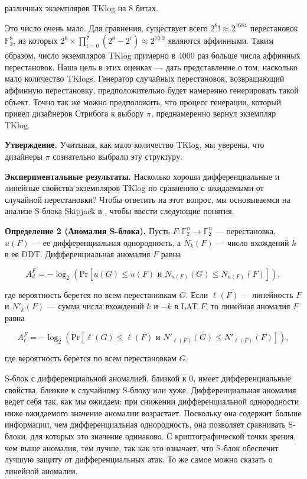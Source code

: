 различных экземпляров TKlog на 8 битах.

Это число очень мало. Для сравнения, существует всего \(2^8! \approx 2^{1684}\) перестановок
\(\mathbb{F}_2^8\), из которых \(2^8 \times \prod_{i=0}^{7}(2^8 - 2^i) \approx 2^{70.2}\) являются
аффинными. Таким образом, число экземпляров TKlog примерно в 4000 раз больше числа аффинных
перестановок. Наша цель в этих оценках — дать представление о том, насколько мало количество
TKlogs. Генератор случайных перестановок, возвращающий аффинную перестановку, предположительно
будет намеренно генерировать такой объект. Точно так же можно предположить, что процесс
генерации, который привел дизайнеров Стрибога к выбору \(\pi\), преднамеренно вернул экземпляр TKlog.

\textbf{Утверждение.} Учитывая, как мало количество TKlog, мы уверены, что дизайнеры \(\pi\)
сознательно выбрали эту структуру.

\textbf{Экспериментальные результаты.} Насколько хороши дифференциальные и линейные
свойства экземпляров TKlog по сравнению с ожидаемыми от случайной перестановки? Чтобы
ответить на этот вопрос, мы основываемся на анализе S-блока Skipjack в \cite{BP15}, чтобы
ввести следующие понятия.

\textbf{Определение 2 (Аномалия S-блока).} Пусть \(F : \mathbb{F}_2^n \to \mathbb{F}_2^n\)
— перестановка, \(u(F)\) — ее дифференциальная однородность, а \(N_k(F)\) — число
вхождений \(k\) в ее DDT. Дифференциальная аномалия \(F\) равна

\[
A_d^F = -\log_2(\mathrm{Pr}[u(G) \leq u(F) \text{ и } N_{u(F)}(G) \leq N_{u(F)}(F)]),
\]

где вероятность берется по всем перестановкам \(G\). Если \(\ell(F)\) — линейность \(F\) и
\(N'_k(F)\) — сумма числа вхождений \(k\) и \(-k\) в LAT \(F\), то линейная аномалия \(F\)
равна

\[
A_\ell^F = -\log_2(\mathrm{Pr}[\ell(G) \leq \ell(F) \text{ и } N'_{\ell(F)}(G) \leq N'_{\ell(F)}(F)]),
\]

где вероятность берется по всем перестановкам \(G\).

S-блок с дифференциальной аномалией, близкой к 0, имеет дифференциальные свойства,
близкие к случайному S-блоку или хуже. Дифференциальная аномалия ведет себя так, как
мы ожидаем: при снижении дифференциальной однородности ниже ожидаемого значение аномалии
возрастает. Поскольку она содержит больше информации, чем дифференциальная однородность,
она позволяет сравнивать S-блоки, для которых это значение одинаково. С криптографической
точки зрения, чем выше аномалия, тем лучше, так как это означает, что S-блок обеспечит
лучшую защиту от дифференциальных атак. То же самое можно сказать о линейной аномалии.


